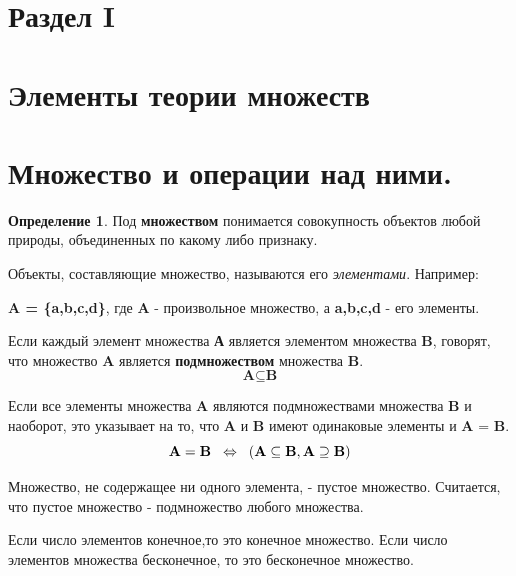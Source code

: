 \documentclass[12pt, a4paper, oneside]{article}
\theoremstyle{plain} %
\theoremstyle{definition}
\newtheorem*{definition}{Определение}  %
\newcommand{\indef}[1]{\textbf{ \color{dark_red} #1}}
\begin{document}
\section*{\textbf{Раздел I}}

\section*{Элементы теории множеств}

\section{Множество и операции над ними.}

\begin{definition}
Под \indef{множеством} понимается совокупность объектов любой природы, объединенных по какому либо признаку.\par
Объекты, составляющие множество, называются его \textit{элементами}.
Например: \par
\hspace{2mm} \textbf{A = \{a,b,c,d\}}, где \textbf{A} - произвольное множество, а \textbf{a,b,c,d} - его элементы.\par
Если каждый элемент множества \textbf{А} является элементом множества \textbf{B}, говорят, что множество \textbf{A} является \indef{подмножеством} множества \textbf{B}. 
\hspace{1cm} \[\textbf{A} \subseteq \textbf{B}\]

Если все элементы множества \textbf{A} являются подмножествами множества \textbf{B} и наоборот, это указывает на то, что \textbf{A} и \textbf{B} имеют одинаковые элементы и \textbf{A} = \textbf{B}.
\[ \textbf{A} = \textbf{B}\hspace{2mm} \Leftrightarrow \hspace{2mm} (\textbf{A} \subseteq \textbf{B}, \textbf{A} \supseteq \textbf{B}) \]

Множество, не содержащее ни одного элемента, - пустое множество. \varnothing \hspace{2mm} Считается, что пустое множество - подмножество любого множества. \par
Если число элементов конечное,то это конечное множество. Если число элементов множества бесконечное, то это бесконечное множество.
\end{definition}
\end{document}
